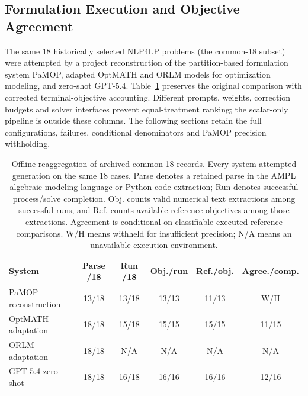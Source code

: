 \subsection{Formulation Execution and Objective Agreement}
\label{subsec:exp_external}
The same 18 historically selected NLP4LP problems (the common-18 subset) were attempted by a project reconstruction of the partition-based formulation system PaMOP, adapted OptMATH and ORLM models for optimization modeling, and zero-shot GPT-5.4. Table~\ref{tab:ext-outcomes} preserves the original comparison with corrected terminal-objective accounting. Different prompts, weights, correction budgets and solver interfaces prevent equal-treatment ranking; the scalar-only pipeline is outside these columns. The following sections retain the full configurations, failures, conditional denominators and PaMOP precision withholding.

\begin{table}[t]
\centering
  \renewcommand{\arraystretch}{1.18}\small
\caption{Offline reaggregation of archived common-18 records. Every system attempted generation on the same 18 cases. Parse denotes a retained parse in the AMPL algebraic modeling language or Python code extraction; Run denotes successful process/solve completion. Obj. counts valid numerical text extractions among successful runs, and Ref. counts available reference objectives among those extractions. Agreement is conditional on classifiable executed reference comparisons. W/H means withheld for insufficient precision; N/A means an unavailable execution environment.}
\label{tab:ext-outcomes}
\setlength{\tabcolsep}{2.5pt}
\begin{tabular}{@{}lccccc@{}}
\toprule
System & Parse /18 & Run /18 & Obj./run & Ref./obj. & Agree./comp.\\
\midrule
PaMOP reconstruction & 13/18 & 13/18 & 13/13 & 11/13 & W/H\\
OptMATH adaptation & 18/18 & 15/18 & 15/15 & 15/15 & 11/15\\
ORLM adaptation & 18/18 & N/A & N/A & N/A & N/A\\
GPT-5.4 zero-shot & 18/18 & 16/18 & 16/16 & 16/16 & 12/16\\
\bottomrule
\end{tabular}
\end{table}
